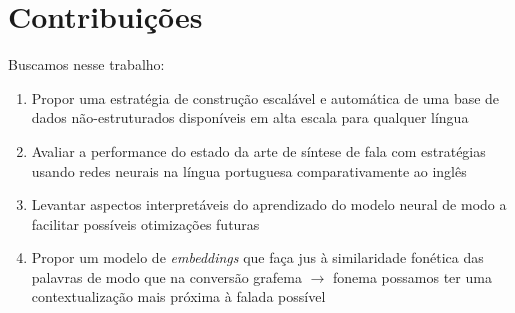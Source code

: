 \section{Contribuições}
\label{sec:contribucoes}
Buscamos nesse trabalho:
\begin{enumerate}
    \item Propor uma estratégia de construção escalável e automática de uma base de dados não-estruturados disponíveis em alta escala para qualquer língua
    \item Avaliar a performance do estado da arte de síntese de fala com estratégias usando redes neurais na língua portuguesa comparativamente ao inglês
    \item Levantar aspectos interpretáveis do aprendizado do modelo neural de modo a facilitar pos\-síveis otimizações futuras %
    \item Propor um modelo de \emph{embeddings} que faça jus à similaridade fonética das palavras de modo que na conversão grafema $\rightarrow$ fonema possamos ter uma contextualização mais próxima à falada possível
\end{enumerate}

\newpage